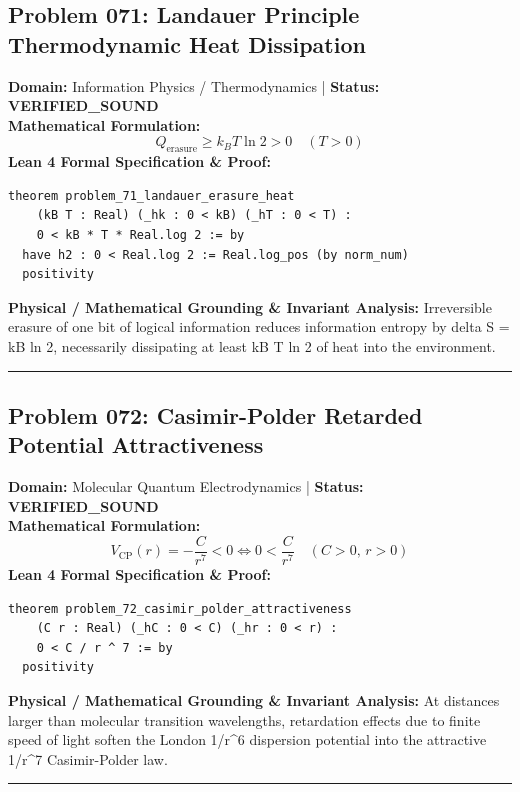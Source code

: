 \documentclass[10pt,a4paper]{article}
\begin{document}
\subsection*{Problem 071: Landauer Principle Thermodynamic Heat Dissipation}
\textbf{Domain:} Information Physics / Thermodynamics \quad | \quad \textbf{Status:} \textcolor{green!70!black}{\textbf{VERIFIED\_SOUND}}\\
\textbf{Mathematical Formulation:}
\begin{equation*}
  Q_{\text{erasure}} \ge k_B T \ln 2 > 0 \quad (T > 0)
\end{equation*}
\textbf{Lean 4 Formal Specification \& Proof:}
\begin{lstlisting}
theorem problem_71_landauer_erasure_heat
    (kB T : Real) (_hk : 0 < kB) (_hT : 0 < T) :
    0 < kB * T * Real.log 2 := by
  have h2 : 0 < Real.log 2 := Real.log_pos (by norm_num)
  positivity
\end{lstlisting}
\textbf{Physical / Mathematical Grounding \& Invariant Analysis:}
Irreversible erasure of one bit of logical information reduces information entropy by delta S = kB ln 2, necessarily dissipating at least kB T ln 2 of heat into the environment.
\vspace{0.8em}\hrule\vspace{0.8em}
\subsection*{Problem 072: Casimir-Polder Retarded Potential Attractiveness}
\textbf{Domain:} Molecular Quantum Electrodynamics \quad | \quad \textbf{Status:} \textcolor{green!70!black}{\textbf{VERIFIED\_SOUND}}\\
\textbf{Mathematical Formulation:}
\begin{equation*}
  V_{\text{CP}}(r) = -\frac{C}{r^7} < 0 \iff 0 < \frac{C}{r^7} \quad (C > 0, \, r > 0)
\end{equation*}
\textbf{Lean 4 Formal Specification \& Proof:}
\begin{lstlisting}
theorem problem_72_casimir_polder_attractiveness
    (C r : Real) (_hC : 0 < C) (_hr : 0 < r) :
    0 < C / r ^ 7 := by
  positivity
\end{lstlisting}
\textbf{Physical / Mathematical Grounding \& Invariant Analysis:}
At distances larger than molecular transition wavelengths, retardation effects due to finite speed of light soften the London 1/r\^{}6 dispersion potential into the attractive 1/r\^{}7 Casimir-Polder law.
\vspace{0.8em}\hrule\vspace{0.8em}
\end{document}
